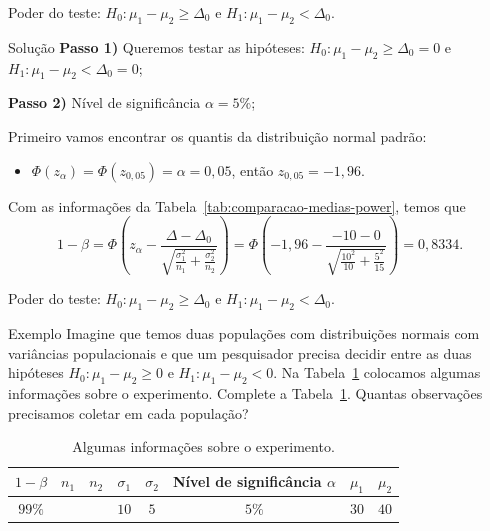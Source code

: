 \documentclass[9pt]{beamer}
\begin{document}
\begin{frame}{Poder do teste: $H_0:\mu_1 - \mu_2 \geq \Delta_0$ e $H_1: \mu_1 - \mu_2 < \Delta_0$.}
	\begin{block}{Solução}
		\textbf{Passo 1)} Queremos testar as hipóteses: $H_0: \mu_1 - \mu_2 \geq \Delta_0 = 0$  e $H_1: \mu_1 - \mu_2 < \Delta_0=0$;
		
		\textbf{Passo 2)} Nível de significância $\alpha=5\%$;
		
		Primeiro vamos encontrar os quantis da distribuição normal padrão:
		\begin{itemize}
			\item $\Phi\left(z_\alpha\right) = \Phi\left(z_{0,05}\right) = \alpha = 0,05$, então $z_{0,05} = -1,96$.
		\end{itemize}
		\vfill
		
		Com as informações da Tabela~\ref{tab:comparacao-medias-power}, temos que 
		$$1-\beta=\Phi\left( z_\alpha - \frac{\Delta - \Delta_0}{\sqrt{ \frac{\sigma_1^2}{n_1} + \frac{\sigma_2^2}{n_2} }} \right)=\Phi\left( -1,96 - \frac{-10 - 0}{\sqrt{ \frac{10^2}{10} + \frac{5^2}{15} }} \right)=0,8334.$$
	\end{block}
\end{frame}

\begin{frame}{Poder do teste: $H_0:\mu_1 - \mu_2 \geq \Delta_0$ e $H_1: \mu_1 - \mu_2 < \Delta_0$.}

\Large

\begin{block}{Exemplo}
	Imagine que temos duas populações com distribuições normais com variâncias populacionais e que um pesquisador precisa decidir entre as duas hipóteses $H_0: \mu_1 - \mu_2 \geq 0$ e $H_1: \mu_1 - \mu_2 < 0$. Na Tabela~\ref{tab:comparacao-medias-sample-size} colocamos algumas informações sobre o experimento. Complete a Tabela~\ref{tab:comparacao-medias-sample-size}. Quantas observações precisamos coletar em cada população?
	\begin{table}[htbp]
		\centering
		\begin{tabular}{c|c|c|c|c|c|c|c}
			\toprule[0.05cm]
			$1-\beta$ & $n_1$ & $n_2$ & 	 $\sigma_1$ & $\sigma_2$ & Nível de significância $\alpha$ & $\mu_1$ & $\mu_2$\\  \midrule[0.025cm]
			$99\%$ &  &  & 	 $10$ & $5$ & $5\%$ & $30$ & $40$\\ \bottomrule[0.05cm] 
		\end{tabular}
		\caption{Algumas informações sobre o experimento.}
		\label{tab:comparacao-medias-sample-size}
	\end{table}	
\end{block}

\normalsize
\end{frame}
\end{document}
